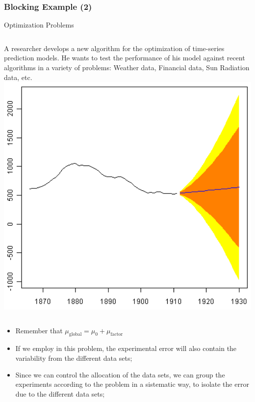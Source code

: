 \documentclass[10pt]{beamer}
\begin{document}
\begin{frame}
  \frametitle{Blocking Example (2)}
  \begin{block}{Optimization Problems}
    \begin{columns}[c]
      A researcher develops a new algorithm for the optimization of
      time-series prediction models. He wants to test the performance of
      his model against recent algorithms in a variety of problems:
      Weather data, Financial data, Sun Radiation data, etc.
      \includegraphics[width=1\textwidth]{img/timeseries}
    \end{columns}
  \end{block}
  \begin{itemize}
  \item Remember that $\mu_{\text{global}} = \mu_{0} + \mu_{\text{factor}}$
  \item If we employ  in this
    problem, the experimental error will also contain the variability
    from the different data sets;
  \item Since we can control the allocation of the data sets, we can
    group the experiments according to the problem in a sistematic
    way, to isolate the error due to the different data sets;
  \end{itemize}
\end{frame}
\end{document}
